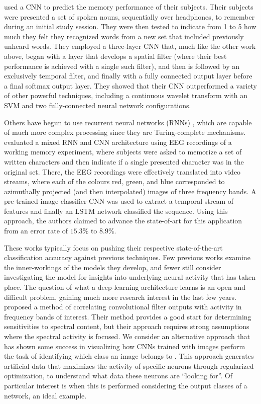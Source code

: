 \documentclass[utf8]{frontiersSCNS} %
\begin{document}
\cite{Sun} used a CNN to predict the memory performance of their subjects. Their subjects were presented a set of spoken nouns, sequentially over headphones, to remember during an initial study session. They were then tested to indicate from 1 to 5 how much they felt they recognized words from a new set that included previously unheard words. They employed a three-layer CNN that, much like the other work above, began with a layer that develops a spatial filter (where their best performance is achieved with a single such filter), and then is followed by an exclusively temporal filter, and finally with a fully connected output layer before a final softmax output layer. They showed that their CNN outperformed a variety of other powerful techniques, including a continuous wavelet transform with an SVM and two fully-connected neural network configurations.

Others have begun to use recurrent neural networks (RNNs) \cite{Bashivan2016}, which are capable of much more complex processing since they are Turing-complete mechanisms. \cite{Bashivan2016} evaluated a mixed RNN and CNN architecture using EEG recordings of a working memory experiment, where subjects were asked to memorize a set of written characters and then indicate if a single presented character was in the original set. There, the EEG recordings were effectively translated into video streams, where each of the colours red, green, and blue corresponded to azimuthally projected (and then interpolated) images of three frequency bands. A pre-trained image-classifier CNN was used to extract a temporal stream of features and finally an LSTM network classified the sequence. Using this approach, the authors claimed to advance the state-of-art for this application from an error rate of $15.3\%$ to $8.9\%$.

These works typically focus on pushing their respective state-of-the-art classification accuracy against previous techniques. Few previous works examine the inner-workings of the models they develop, and fewer still consider investigating the model for insights into underlying neural activity that has taken place. The question of what a deep-learning architecture learns is an open and difficult problem, gaining much more research interest in the last few years. \cite{Schirrmeister2017} proposed a method of correlating convolutional filter outputs with activity in frequency bands of interest. Their method provides a good start for determining sensitivities to spectral content, but their approach requires strong assumptions where the spectral activity is focused. We consider an alternative approach that has shown some success in visualizing how CNNs trained with images perform the task of identifying which class an image belongs to \cite{Yosinski2015}. This approach generates artificial data that maximizes the activity of specific neurons through regularized optimization, to understand what data these neurons are ``looking for''. Of particular interest is when this is performed considering the output classes of a network, an ideal example. 
\end{document}
